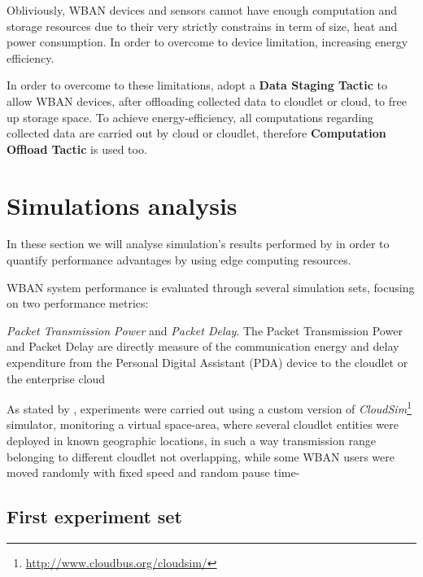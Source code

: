 \documentclass[sigchi]{acmart}
\begin{document}
\vspace{0.3cm}

Obliviously, WBAN devices and sensors cannot have enough computation and storage resources due to their very strictly constrains in term of size, heat and power consumption. In order to overcome to device limitation, increasing energy efficiency.

In order to overcome to these limitations, \citet{MSAReport} adopt a \textbf{Data Staging Tactic} to allow WBAN devices, after oﬄoading
collected data to cloudlet or cloud, to free up storage space. To achieve energy-efficiency, all computations regarding collected data 
are carried out by cloud or cloudlet, therefore \textbf{Computation Offload Tactic} is used too.

\section{Simulations analysis}

In these section we will analyse simulation's results performed by \citet{MSAReport} in order to quantify performance advantages by using edge computing resources. 

WBAN system performance is evaluated through several simulation sets, focusing on two performance metrics:

\vspace{0.3cm}

\begin{quoting}[font=itshape, begintext={``}, endtext={''\cite[par.~4.2]{MSAReport}}]
\textit{Packet Transmission Power} and \textit{Packet Delay}. The Packet Transmission Power and Packet Delay are directly measure of the communication energy and delay expenditure from the Personal Digital Assistant (PDA) device to the cloudlet or the enterprise cloud
\end{quoting}

\vspace{0.3cm}

As stated by \citet{MSAReport}, experiments were carried out using a custom version of \textit{CloudSim}\footnote{\url{http://www.cloudbus.org/cloudsim/}} simulator, monitoring a virtual space-area, where several cloudlet entities were deployed in known geographic locations, in such a way transmission range belonging to different cloudlet not overlapping, while some WBAN users were moved randomly with fixed speed and random pause time- 

\subsection{First experiment set}
\end{document}
